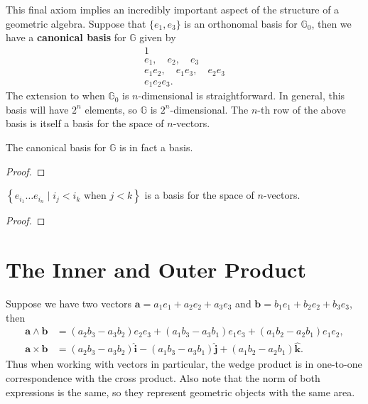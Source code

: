 \documentclass[twoside,10pt]{article}
\begin{document}
This final axiom implies an incredibly important aspect of the structure of a geometric algebra. Suppose that $\{ {e}_{1}, {e}_{3}\}$ is an orthonomal basis for $\mathbb{G}_{0}$, then we have a \textbf{canonical basis} for $\mathbb{G}$ given by
\[
	\begin{gathered}
	1 \\
	e_1, \quad e_2,\quad e_3 \\
	e_1e_2, \quad e_1e_3,\quad e_2e_3 \\
	e_1e_2e_3.
	\end{gathered}
\]
The extension to when $\mathbb{G}_{0}$ is $n$-dimensional is straightforward. In general, this basis will have $2^{n}$ elements, so $\mathbb{G}$ is $2^{n}$-dimensional. The $n$-th row of the above basis is itself a basis for the space of $n$-vectors.

\begin{prop}
The canonical basis for $\mathbb{G}$ is in fact a basis.
\end{prop}
\begin{proof}
\end{proof}

\begin{prop}
	$\left\{ e_{i_1}\dots e_{i_n} \;|\; i_j < i_k \text{ when } j<k \right\}$ is a basis for the space of $n$-vectors.
\end{prop}
\begin{proof}
\end{proof}




\section{The Inner and Outer Product}


\begin{ex}
Suppose we have two vectors $\mathbf{a} = a_1e_1 + a_2e_2+a_3e_3$ and $\mathbf{b} = b_1e_1+b_2e_2+b_3e_3$, then
\begin{align*}
	\mathbf{a} \wedge \mathbf{b} &= (a_2b_3-a_3b_2)e_2e_3 + (a_1b_3-a_3b_1)e_1e_3 + (a_1b_2-a_2b_1)e_1e_2, \\
	\mathbf{a} \times \mathbf{b} &= (a_2b_3-a_3b_2)\hat{\mathbf{i}} - (a_1b_3-a_3b_1)\hat{\mathbf{j}} + (a_1b_2-a_2b_1)\hat{\mathbf{k}}.
\end{align*}
Thus when working with vectors in particular, the wedge product is in one-to-one correspondence with the cross product. Also note that the norm of both expressions is the same, so they represent geometric objects with the same area.

\end{ex}
\end{document}
